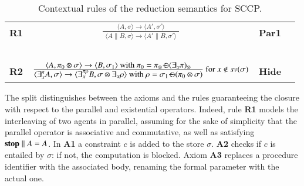 \documentclass[preprint,12pt]{elsarticle}
\newcommand{\ostop}{{\bf stop}}
\newcommand{\rarrow}{\rightarrow}
\def\odiv{\, {\ominus\hspace{-7.7pt} \div} \,}
\begin{document}
\begin{table}  %
	\begin{center}
		\begin{tabular}{lcll} 
			\mbox{\bf R1}& $\frac {\displaystyle \langle A, \sigma\rangle \to \langle A', \sigma' \rangle} 
			{\displaystyle \begin{array}{l}
				\langle A\parallel B, \sigma \rangle \to \langle A'\parallel B, \sigma' \rangle
				\end{array}}$ 
			& \bf{Par1}&
			\\
			& \mbox{   }&\mbox{   }&
			\\
			\mbox{\bf R2}& $\frac {\displaystyle \langle A, \pi_0 \otimes \sigma \rangle
				\to \langle B, \sigma_1 \rangle \text{ with } \pi_0 = \pi_\otimes \odiv (\exists_x \pi)_\otimes}
			{\displaystyle\langle \exists^{\pi}_x A,\sigma\rangle \to \langle 
				\exists^{\pi \rho}_x B, \sigma \otimes \exists_x \rho
				\rangle \text{ with } \rho = \sigma_1 \odiv (\pi_0 \otimes \sigma)} \text{ for } x \not \in sv(\sigma)$
			&\bf{Hide}&
		\end{tabular}
	\end{center}
	\caption{Contextual rules of the reduction semantics for SCCP.}
	\label{fig:operational2}
\end{table}

The split distinguishes between the axioms and the rules guaranteeing the closure with respect to the parallel and existential operators. Indeed, rule {\bf  R1} models the interleaving of two agents in parallel, assuming for the sake of simplicity
that the parallel operator is associative and commutative, as well as satisfying $ \hbox{\ostop} \parallel A = A$.
%
%
In {\bf A1} a constraint $c$ is added to the store $\sigma$.
%
{\bf A2} checks if $c$ is entailed by  $\sigma$: if not, the computation is blocked.
%
Axiom {\bf A3} replaces a procedure identifier with the associated body, renaming the formal parameter with the actual one.
%
\end{document}
